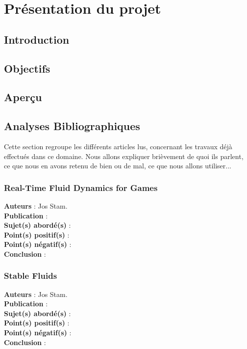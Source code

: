 \documentclass[a4paper,10pt]{article}
\begin{document}
\newpage

\tableofcontents

\newpage
\newpage



\section{Présentation du projet}
\subsection{Introduction}

\subsection{Objectifs}


\subsection{Aperçu}


\subsection{Analyses Bibliographiques}
Cette section regroupe les différents articles lus, concernant les travaux déjà effectués dans ce domaine. 
Nous allons expliquer brièvement de quoi ils parlent, ce que nous en avons retenu de bien ou de mal, ce que nous allons 
utiliser...

\subsubsection{Real-Time Fluid Dynamics for Games}
\textbf{Auteurs} : Jos Stam.\\
\textbf{Publication} : \\
\textbf{Sujet(s) abordé(s)} : \\
\textbf{Point(s) positif(s)} :\\
\textbf{Point(s) négatif(s)} :\\
\textbf{Conclusion} :\\

\subsubsection{Stable Fluids}
\textbf{Auteurs} : Jos Stam.\\
\textbf{Publication} :\\
\textbf{Sujet(s) abordé(s)} : \\
\textbf{Point(s) positif(s)} :\\
\textbf{Point(s) négatif(s)} :\\
\textbf{Conclusion} :\\
\end{document}
